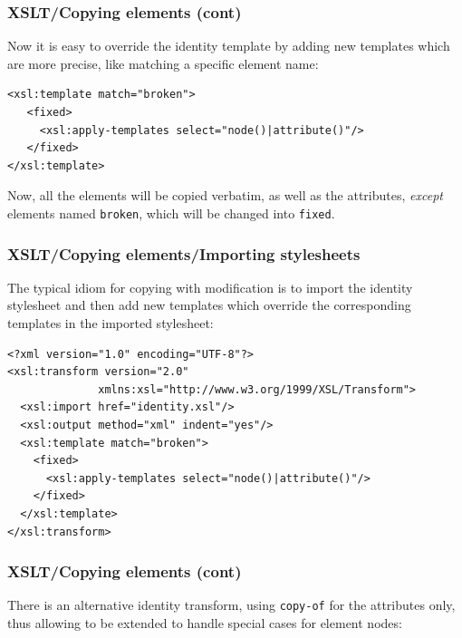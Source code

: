 %
\begin{frame}[containsverbatim]
\frametitle{XSLT/Copying elements (cont)}

Now it is easy to override the identity template by adding new
templates which are more precise, like matching a specific element
name:
{\small
\begin{verbatim}
<xsl:template match="broken">
   <fixed>
     <xsl:apply-templates select="node()|attribute()"/>
   </fixed>
</xsl:template>
\end{verbatim}
}
Now, all the elements will be copied verbatim, as well as the
attributes, \emph{except} elements named \texttt{broken}, which will
be changed into \texttt{fixed}.

\end{frame}

%
\begin{frame}[containsverbatim]
\frametitle{XSLT/Copying elements/Importing stylesheets}

The typical idiom for copying with modification is to import the
identity stylesheet and then add new templates which override the
corresponding templates in the imported stylesheet:
{\small
\begin{verbatim}
<?xml version="1.0" encoding="UTF-8"?>
<xsl:transform version="2.0"
              xmlns:xsl="http://www.w3.org/1999/XSL/Transform">
  <xsl:import href="identity.xsl"/>
  <xsl:output method="xml" indent="yes"/>
  <xsl:template match="broken">
    <fixed>
      <xsl:apply-templates select="node()|attribute()"/>
    </fixed>
  </xsl:template>
</xsl:transform>
\end{verbatim}
}

\end{frame}

%
\begin{frame}
\frametitle{XSLT/Copying elements (cont)}

There is an alternative identity transform, using \texttt{copy-of} for
the attributes only, thus allowing to be extended to handle special
cases for element nodes: 

\end{frame}

